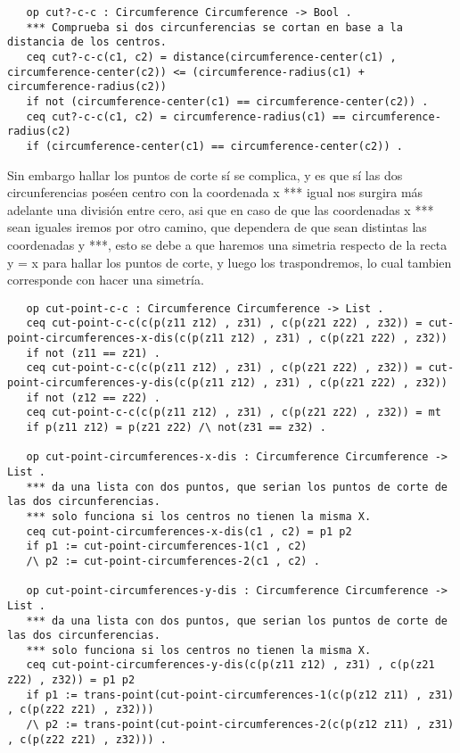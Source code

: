 \documentclass[12pt,a4paper]{book}
\begin{document}
\begin{verbatim}
   op cut?-c-c : Circumference Circumference -> Bool .
   *** Comprueba si dos circunferencias se cortan en base a la distancia de los centros.
   ceq cut?-c-c(c1, c2) = distance(circumference-center(c1) , circumference-center(c2)) <= (circumference-radius(c1) + circumference-radius(c2))
   if not (circumference-center(c1) == circumference-center(c2)) . 
   ceq cut?-c-c(c1, c2) = circumference-radius(c1) == circumference-radius(c2)
   if (circumference-center(c1) == circumference-center(c2)) .

\end{verbatim}

Sin embargo hallar los puntos de corte s\'i se complica, y es que s\'i las dos circunferencias pos\'een centro con la coordenada x *** igual nos surgira m\'as adelante una divisi\'on entre cero, asi que en caso de que las coordenadas x *** sean iguales iremos por otro camino, que dependera de que sean distintas las coordenadas y ***, esto se debe a que haremos una simetria respecto de la recta y = x para hallar los puntos de corte, y luego los traspondremos, lo cual tambien corresponde con hacer una simetr\'ia. \\

\begin{verbatim}
   op cut-point-c-c : Circumference Circumference -> List .
   ceq cut-point-c-c(c(p(z11 z12) , z31) , c(p(z21 z22) , z32)) = cut-point-circumferences-x-dis(c(p(z11 z12) , z31) , c(p(z21 z22) , z32)) 
   if not (z11 == z21) .
   ceq cut-point-c-c(c(p(z11 z12) , z31) , c(p(z21 z22) , z32)) = cut-point-circumferences-y-dis(c(p(z11 z12) , z31) , c(p(z21 z22) , z32))
   if not (z12 == z22) .
   ceq cut-point-c-c(c(p(z11 z12) , z31) , c(p(z21 z22) , z32)) = mt 
   if p(z11 z12) = p(z21 z22) /\ not(z31 == z32) .

   op cut-point-circumferences-x-dis : Circumference Circumference -> List .
   *** da una lista con dos puntos, que serian los puntos de corte de las dos circunferencias.
   *** solo funciona si los centros no tienen la misma X.
   ceq cut-point-circumferences-x-dis(c1 , c2) = p1 p2
   if p1 := cut-point-circumferences-1(c1 , c2) 
   /\ p2 := cut-point-circumferences-2(c1 , c2) .

   op cut-point-circumferences-y-dis : Circumference Circumference -> List .
   *** da una lista con dos puntos, que serian los puntos de corte de las dos circunferencias.
   *** solo funciona si los centros no tienen la misma X.
   ceq cut-point-circumferences-y-dis(c(p(z11 z12) , z31) , c(p(z21 z22) , z32)) = p1 p2
   if p1 := trans-point(cut-point-circumferences-1(c(p(z12 z11) , z31) , c(p(z22 z21) , z32))) 
   /\ p2 := trans-point(cut-point-circumferences-2(c(p(z12 z11) , z31) , c(p(z22 z21) , z32))) .

\end{verbatim}
\end{document}
